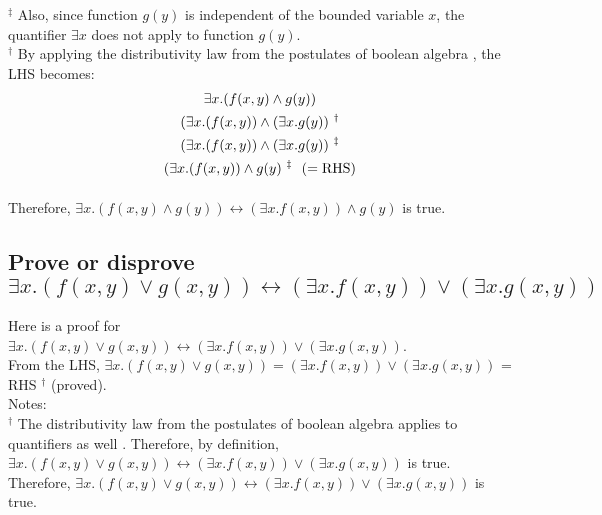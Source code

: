 \documentclass[letter,12pt]{article}
\begin{document}
$^{\ddagger}$ Also, since function $g(y)$ is independent of the bounded variable $x$, the quantifier $\exists x$ does not apply to function $g(y)$. \\

$^{\dagger}$ By applying the distributivity law from the postulates of boolean algebra \cite[\S7.2.2, pp. 135, Definition 7.12]{BenAri2009} \cite[\S3.1, pp. 29]{Brown1990}, the LHS becomes:\\
\begin{eqnarray*}
	\begin{gathered}[b]
	\exists x.(f(x, y) \land g(y)) \\
	(\exists x.(f(x, y)) \land (\exists x.g(y)) \ ^{\dagger} \\
	(\exists x.(f(x, y)) \land (\exists x.g(y)) \ ^{\ddagger} \\
	(\exists x.(f(x, y)) \land g(y) \ ^{\ddagger}\ \ {\rm ( = RHS)} \\
	\end{gathered}
\end{eqnarray*}


Therefore, $\exists x.(f(x, y) \land g(y)) \leftrightarrow (\exists x.f(x, y)) \land g(y)$ is true.

\subsection{Prove or disprove $\exists x.(f(x, y) \lor g(x, y)) \leftrightarrow (\exists x.f(x, y)) \lor (\exists x.g(x, y))$}
\label{ssec:q2c}

Here is a proof for $\exists x.(f(x, y) \lor g(x, y)) \leftrightarrow (\exists x.f(x, y)) \lor (\exists x.g(x, y))$. \\

From the LHS, $\exists x.(f(x, y) \lor g(x, y)) = (\exists x.f(x, y)) \lor (\exists x.g(x, y))$ = RHS $^{\dagger}$ (proved).\\

Notes:\\
$^{\dagger}$ The distributivity law from the postulates of boolean algebra applies to quantifiers as well \cite[\S7.2.2, pp. 135, Definition 7.12]{BenAri2009} \cite[\S3.1, pp. 29]{Brown1990}. Therefore, by definition, $\exists x.(f(x, y) \lor g(x, y)) \leftrightarrow (\exists x.f(x, y)) \lor (\exists x.g(x, y))$ is true. \\

Therefore, $\exists x.(f(x, y) \lor g(x, y)) \leftrightarrow (\exists x.f(x, y)) \lor (\exists x.g(x, y))$ is true.
\end{document}
